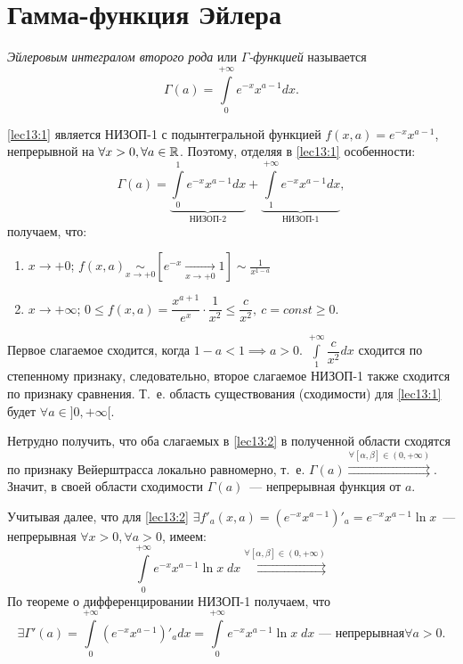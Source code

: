 \documentclass[../../main.tex]{subfiles}
\begin{document}
\section{Гамма-функция Эйлера}

\emph{Эйлеровым интегралом второго рода} или \emph{$\Gamma$-функцией} 
называется
\begin{equation}
\label{lec13:1}
\Gamma(a) = \int\limits_0^{+\infty}e^{-x}x^{a-1}dx.
\end{equation}

\eqref{lec13:1} является НИЗОП-1 с подынтегральной функцией
$f(x, a) = e^{-x}x^{a-1}$, непрерывной на $\forall x > 0, \forall a \in \mathbb{R}$. 
Поэтому, отделяя в \eqref{lec13:1} особенности:
\begin{equation}
	\Gamma(a) = \underbrace{\int\limits_0^1e^{-x}x^{a-1}dx}_{\text{НИЗОП-2}} + 
	\underbrace{\int\limits_1^{+\infty}e^{-x}x^{a-1}dx}_{\text{НИЗОП-1}},
\label{lec13:2} 
\end{equation}
получаем, что:
\begin{enumerate}
\item 
$x \to + 0$; 
$\displaystyle f(x, a) \underset{x \to +0}\sim \left[ e^{-x} 
\underset{x \to +0} \to 1 \right] \sim \frac{1}{x^{1-a}}$
\item
$x \to +\infty$;
$0 \le f(x, a) = \dfrac{x^{a+1}}{e^x} \cdot \dfrac{1}{x^2} \le 
\dfrac{c}{x^2},\ 
c=const \ge 0$.
\end{enumerate}
Первое слагаемое сходится, когда $1 - a < 1 \implies a > 0$.
$\int\limits_1^{+\infty}\dfrac{c}{x^2}dx$ сходится по степенному признаку, 
следовательно, второе слагаемое НИЗОП-1 также сходится по признаку сравнения.
Т.~е. область существования (сходимости) для \eqref{lec13:1} будет $\forall a 
\in ]0, +\infty[$.

Нетрудно получить, что оба слагаемых в \eqref{lec13:2} в полученной области 
сходятся по признаку Вейерштрасса локально равномерно, т.~е.
$\Gamma(a) \overset{\forall \left[ \alpha, \beta \right] \in (0, 
+\infty)}{\rightrightarrows}$.
Значит, в своей области сходимости $\Gamma(a)$~--- непрерывная функция от $a$.

Учитывая далее, что для \eqref{lec13:2}
$\exists f'_a(x, a) = (e^{-x} x^{a-1})'_a = e^{-x}x^{a-1} \ln x$~--- 
непрерывная $\forall x>0,\forall a >0$, имеем:
\[
\int\limits_0^{+\infty} e^{-x} x^{a-1} \ln x\; dx
\overset{\forall \left[ \alpha, \beta \right] \in (0, 
	+\infty)}{\rightrightarrows}
\]
По теореме о дифференцировании НИЗОП-1 получаем, что
\[
\exists \Gamma'(a) = \int\limits_0^{+\infty} (e^{-x} x^{a-1})'_a dx = 
\int\limits_0^{+\infty} e^{-x} x^{a-1} \ln x\; dx 
\text{~--- непрерывная
$\forall a > 0$}.\]
\end{document}
